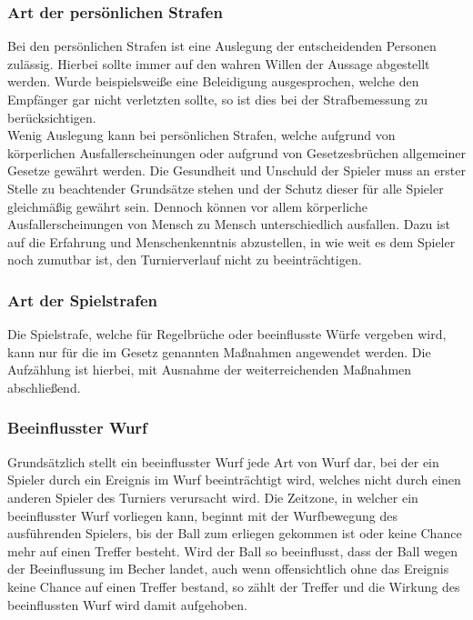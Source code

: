 \documentclass[a5paper, 12pt]{article}
\begin{document}
\subsubsection{Art der persönlichen Strafen}
Bei den persönlichen Strafen ist eine Auslegung der entscheidenden Personen zulässig. Hierbei sollte immer auf den wahren Willen der Aussage abgestellt werden. Wurde beispielsweiße eine Beleidigung ausgesprochen, welche den Empfänger gar nicht verletzten sollte, so ist dies bei der Strafbemessung zu berücksichtigen.\\
Wenig Auslegung kann bei persönlichen Strafen, welche aufgrund von körperlichen Ausfallerscheinungen oder aufgrund von Gesetzesbrüchen allgemeiner Gesetze gewährt werden. Die Gesundheit und Unschuld der Spieler muss an erster Stelle zu beachtender Grundsätze stehen und der Schutz dieser für alle Spieler gleichmäßig gewährt sein. Dennoch können vor allem körperliche Ausfallerscheinungen von Mensch zu Mensch unterschiedlich ausfallen. Dazu ist auf die Erfahrung und Menschenkenntnis abzustellen, in wie weit es dem Spieler noch zumutbar ist, den Turnierverlauf nicht zu beeinträchtigen.
\subsubsection{Art der Spielstrafen}
Die Spielstrafe, welche für Regelbrüche oder beeinflusste Würfe vergeben wird, kann nur für die im Gesetz genannten Maßnahmen angewendet werden. Die Aufzählung ist hierbei, mit Ausnahme der weiterreichenden Maßnahmen abschließend.
\subsubsection{Beeinflusster Wurf}
Grundsätzlich stellt ein beeinflusster Wurf jede Art von Wurf dar, bei der ein Spieler durch ein Ereignis im Wurf beeinträchtigt wird, welches nicht durch einen anderen Spieler des Turniers verursacht wird. Die Zeitzone, in welcher ein beeinflusster Wurf vorliegen kann, beginnt mit der Wurfbewegung des ausführenden Spielers, bis der Ball zum erliegen gekommen ist oder keine Chance mehr auf einen Treffer besteht. Wird der Ball so beeinflusst, dass der Ball wegen der Beeinflussung im Becher landet, auch wenn offensichtlich ohne das Ereignis keine Chance auf einen Treffer bestand, so zählt der Treffer und die Wirkung des beeinflussten Wurf wird damit aufgehoben.
\end{document}
